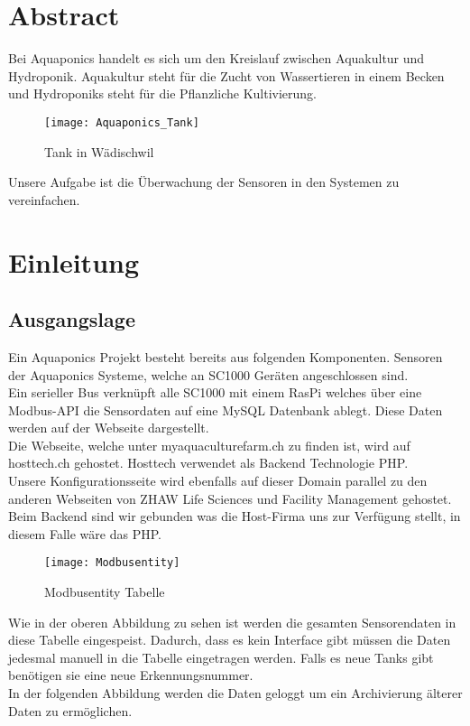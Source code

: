 \documentclass[../main.tex]{subfiles}
\begin{document}
	
	\section{Abstract}
	Bei Aquaponics handelt es sich um den Kreislauf zwischen Aquakultur und Hydroponik. Aquakultur steht für die Zucht von Wassertieren in einem Becken und Hydroponiks steht für die Pflanzliche Kultivierung. \\
	
	
	\begin{figure}[H]
		\centering
		\texttt{[image: Aquaponics\_Tank]}
		\caption{Tank in Wädischwil}
		\label{fig:Aquaponics_Tank}
	\end{figure}
	\par \noindent
	Unsere Aufgabe ist die Überwachung der Sensoren in den Systemen zu vereinfachen. \\
	
	\section{Einleitung}
	
	\subsection{Ausgangslage}
	Ein Aquaponics Projekt besteht bereits aus folgenden Komponenten. Sensoren der Aquaponics Systeme, welche an SC1000 Geräten angeschlossen sind. \\
	Ein serieller Bus verknüpft alle SC1000 mit einem RasPi welches über eine Modbus-API die Sensordaten auf eine MySQL Datenbank ablegt. Diese Daten werden auf der Webseite dargestellt. \\
	Die Webseite, welche unter myaquaculturefarm.ch zu finden ist, wird auf hosttech.ch gehostet. Hosttech verwendet als Backend Technologie PHP.\\
	Unsere Konfigurationsseite wird ebenfalls auf dieser Domain parallel zu den anderen Webseiten von ZHAW Life Sciences und Facility Management gehostet. \\
	Beim Backend sind wir gebunden was die Host-Firma uns zur Verfügung stellt, in diesem Falle wäre das PHP.
	
	\begin{figure}[H]
		\centering
		\texttt{[image: Modbusentity]}
		\caption{Modbusentity Tabelle}
		\label{fig:Modbusentity}
	\end{figure}
	\par \noindent
	Wie in der oberen Abbildung zu sehen ist werden die gesamten Sensorendaten in diese Tabelle eingespeist. Dadurch, dass es kein Interface gibt müssen die Daten jedesmal manuell in die Tabelle eingetragen werden. Falls es neue Tanks gibt benötigen sie eine neue Erkennungsnummer.  \\
	In der folgenden Abbildung werden die Daten geloggt um ein Archivierung älterer Daten zu ermöglichen.
	
\end{document}
